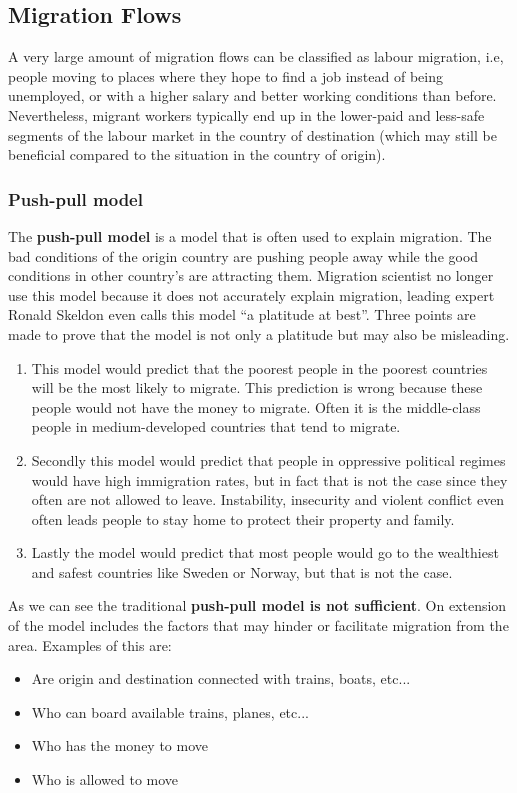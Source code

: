 \documentclass[../summary.tex]{subfiles}
\begin{document}
	\subsection{Migration Flows}
	A very large amount of migration flows can be classified as labour migration, i.e, people moving to places where they hope to find a job instead of being unemployed, or with a higher salary and better working conditions than before. Nevertheless, migrant workers typically end up in the lower-paid and less-safe segments of the labour market in the country of destination (which may still be beneficial compared to the situation in the country of origin).
	
	\subsubsection{Push-pull model}
	The \textbf{push-pull model} is a model that is often used to explain migration. The bad conditions of the origin country are pushing people away while the good conditions in other country's are attracting them. Migration scientist no longer use this model because it does not accurately explain migration, leading expert Ronald Skeldon even calls this model  ``a platitude at best''. Three points are made to prove that the model is not only a platitude but may also be misleading.
	\begin{enumerate}
		\item This model would predict that the poorest people in the poorest countries will be the most likely to migrate. This prediction is wrong because these people would not have the money to migrate. Often it is the middle-class people in medium-developed countries that tend to migrate. 
		\item Secondly this model would predict that people in oppressive political regimes would have high immigration rates, but in fact that is not the case since they often are not allowed to leave. Instability, insecurity and violent conflict even often leads people to stay home to protect their property and family.
		\item Lastly the model would predict that most people would go to the wealthiest and safest countries like Sweden or Norway, but that is not the case.
	\end{enumerate}
	As we can see the traditional \textbf{push-pull model is not sufficient}. On extension of the model includes the factors that may hinder or facilitate migration from the area. Examples of this are:
	\begin{itemize}
		\item Are origin and destination connected with trains, boats, etc...
		\item Who can board available trains, planes, etc...
		\item Who has the money to move
		\item Who is allowed to move
	\end{itemize}
	\newpage
	
\end{document}
